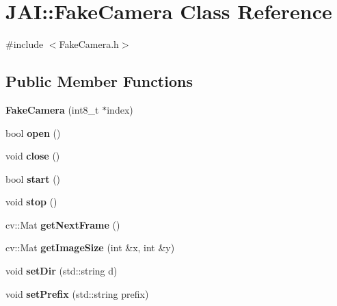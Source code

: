 \hypertarget{class_j_a_i_1_1_fake_camera}{\section{J\-A\-I\-:\-:Fake\-Camera Class Reference}
\label{class_j_a_i_1_1_fake_camera}
}


{\ttfamily \#include $<$Fake\-Camera.\-h$>$}

\subsection*{Public Member Functions}
\begin{DoxyCompactItemize}
\item 
\hypertarget{class_j_a_i_1_1_fake_camera_a27873931c8a36a83366a45fda6168132}{{\bfseries Fake\-Camera} (int8\-\_\-t $\ast$index)}\label{class_j_a_i_1_1_fake_camera_a27873931c8a36a83366a45fda6168132}

\item 
\hypertarget{class_j_a_i_1_1_fake_camera_a79655c3e28916d371cd1c69547c1db9f}{bool {\bfseries open} ()}\label{class_j_a_i_1_1_fake_camera_a79655c3e28916d371cd1c69547c1db9f}

\item 
\hypertarget{class_j_a_i_1_1_fake_camera_a096b49ab1ff349fd610256742acaed44}{void {\bfseries close} ()}\label{class_j_a_i_1_1_fake_camera_a096b49ab1ff349fd610256742acaed44}

\item 
\hypertarget{class_j_a_i_1_1_fake_camera_a3a7238104fb58938ae6513060d7ffad4}{bool {\bfseries start} ()}\label{class_j_a_i_1_1_fake_camera_a3a7238104fb58938ae6513060d7ffad4}

\item 
\hypertarget{class_j_a_i_1_1_fake_camera_a6d6196eb18421ed8a2bd3c4a49c151f9}{void {\bfseries stop} ()}\label{class_j_a_i_1_1_fake_camera_a6d6196eb18421ed8a2bd3c4a49c151f9}

\item 
\hypertarget{class_j_a_i_1_1_fake_camera_ad675ea655aa71a534c9e91be0ad0dc06}{cv\-::\-Mat {\bfseries get\-Next\-Frame} ()}\label{class_j_a_i_1_1_fake_camera_ad675ea655aa71a534c9e91be0ad0dc06}

\item 
\hypertarget{class_j_a_i_1_1_fake_camera_a568b34dd23a04fc6713bbf18ecd312b4}{cv\-::\-Mat {\bfseries get\-Image\-Size} (int \&x, int \&y)}\label{class_j_a_i_1_1_fake_camera_a568b34dd23a04fc6713bbf18ecd312b4}

\item 
\hypertarget{class_j_a_i_1_1_fake_camera_a5e2d8f01656c76f5af689b76afe4706a}{void {\bfseries set\-Dir} (std\-::string d)}\label{class_j_a_i_1_1_fake_camera_a5e2d8f01656c76f5af689b76afe4706a}

\item 
\hypertarget{class_j_a_i_1_1_fake_camera_a67d85e9ba3f784f3596329197aeeb389}{void {\bfseries set\-Prefix} (std\-::string prefix)}\label{class_j_a_i_1_1_fake_camera_a67d85e9ba3f784f3596329197aeeb389}

\end{DoxyCompactItemize}
